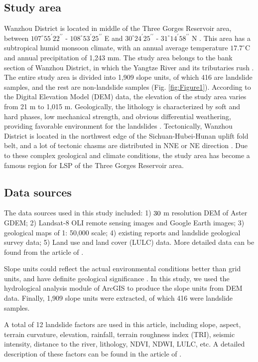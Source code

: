 \documentclass[a4paper,fleqn]{cas-sc}
\begin{document}
\subsection{Study area}
Wanzhou District is located in middle of the Three Gorges Reservoir area, between $107^\circ 55^\prime 22^{\prime \prime}$ - $108^\circ 53^\prime 25^{\prime \prime}$ E and $30^\circ 24^\prime 25^{\prime \prime}$ - $31^\circ 14^\prime 58^{\prime \prime}$ N \citep{Song2018}.
This area has a subtropical humid monsoon climate, with an annual average temperature $17.7^\circ$C and annual precipitation of 1,243 mm.
The study area belongs to the bank section of Wanzhou District, in which the Yangtze River and its tributaries rush \citep{Zhang2022}.
The entire study area is divided into 1,909 slope units, of which 416 are landslide samples, and the rest are non-landslide samples (Fig. \ref{fig:Figure1}).
According to the Digital Elevation Model (DEM) data, the elevation of the study area varies from 21 m to 1,015 m.
Geologically, the lithology is characterized by soft and hard phases, low mechanical strength, and obvious differential weathering, providing favorable environment for the landslides \citep{Zhang2022}.
Tectonically, Wanzhou District is located in the northwest edge of the Sichuan-Hubei-Hunan uplift fold belt, and a lot of tectonic chasms are distributed in NNE or NE direction \citep{Zhang2022}.
Due to these complex geological and climate conditions, the study area has become a famous region for LSP of the Three Gorges Reservoir area. 

\subsection{Data sources}

The data sources used in this study included: 1) $30 \time 30$ m resolution DEM of Aster GDEM; 2) Landsat-8 OLI remote sensing images and Google Earth images; 3) geological maps of 1: 50,000 scale; 4) existing reports and landslide geological survey data; 5) Land use and land cover (LULC) data.
More detailed data can be found from the article of \cite{Zhang2022}.

Slope units could reflect the actual environmental conditions better than grid units, and have definite geological significance \citep{Zhao2021}. 
In this study, we used the hydrological analysis module of ArcGIS to produce the slope units from DEM data. 
Finally, 1,909 slope units were extracted, of which 416 were landslide samples.

A total of 12 landslide factors are used in this article, including slope, aspect, terrain curvature, elevation, rainfall, terrain roughness index (TRI), seismic intensity, distance to the river, lithology, NDVI, NDWI, LULC, etc.
A detailed description of these factors can be found in the article of \cite{Zhang2022}.
\end{document}
